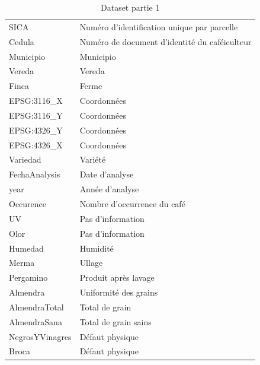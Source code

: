 \begin{table}[H]
	\centering
	\caption{Dataset partie 1}
	\label{my-label}
	\begin{tabular}{ll}
		SICA            & Numéro d'identification unique par parcelle        \\
		Cedula          & Numéro de document d'identité du caféiculteur      \\
		Municipio       & Municipio                                          \\
		Vereda          & Vereda                                             \\
		Finca           & Ferme                                              \\
		EPSG:3116\_X    & Coordonnées                                        \\
		EPSG:3116\_Y    & Coordonnées                                        \\
		EPSG:4326\_Y    & Coordonnées                                        \\
		EPSG:4326\_X    & Coordonnées                                        \\
		Variedad        & Variété                                            \\
		FechaAnalysis   & Date d'analyse                                     \\
		year            & Année d'analyse                                    \\
		Occurence       & Nombre d'occurrence du café                        \\
		UV              & Pas d'information                                  \\
		Olor            & Pas d'information                                  \\
		Humedad         & Humidité                                           \\
		Merma           & Ullage                                             \\
		Pergamino       & Produit après lavage                               \\
		Almendra        & Uniformité des grains                              \\
		AlmendraTotal   & Total de grain                                     \\
		AlmendraSana    & Total de grain sains                               \\
		NegrosYVinagres & Défaut physique                                    \\
		Broca           & Défaut physique                                    \\
		\end{tabular}
\end{table}

